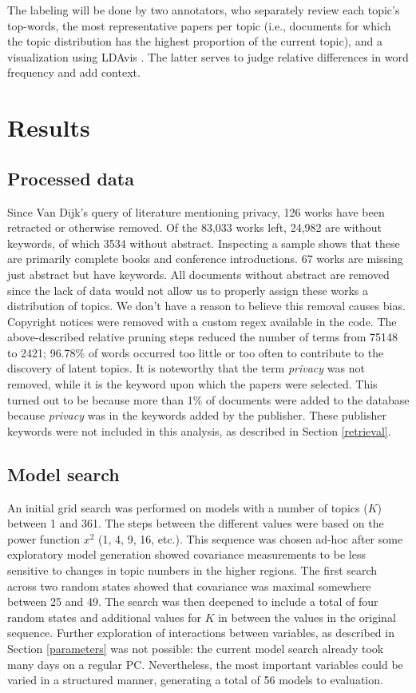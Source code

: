 \documentclass[runningheads]{llncs}
\begin{document}
The labeling will be done by two annotators, who separately review each topic’s top-words, the most representative papers per topic (i.e., documents for which the topic distribution has the highest proportion of the current topic), and a visualization using LDAvis \cite{sievert2014ldavis}. The latter serves to judge relative differences in word frequency and add context.


\section{Results}
\label{results}
\subsection{Processed data}
Since Van Dijk’s \cite{van_dijk_pillars_nodate} query of literature mentioning privacy, 126 works have been retracted or otherwise removed. Of the 83,033 works left, 24,982 are without keywords, of which 3534 without abstract. Inspecting a sample shows that these are primarily complete books and conference introductions. 67 works are missing just abstract but have keywords. All documents without abstract are removed since the lack of data would not allow us to properly assign these works a distribution of topics. We don’t have a reason to believe this removal causes bias. Copyright notices were removed with a custom regex available in the code. The above-described relative pruning steps reduced the number of terms from 75148 to 2421; 96.78\% of words occurred too little or too often to contribute to the discovery of latent topics. It is noteworthy that the term \textit{privacy} was not removed, while it is the keyword upon which the papers were selected. This turned out to be because more than 1\% of documents were added to the database because \textit{privacy} was in the keywords added by the publisher. These publisher keywords were not included in this analysis, as described in Section \ref{retrieval}.

\subsection{Model search}
\label{search}
An initial grid search was performed on models with a number of topics ($K$) between 1 and 361. The steps between the different values were based on the power function $x^2$ (1, 4, 9, 16, etc.). This sequence was chosen ad-hoc after some exploratory model generation showed covariance measurements to be less sensitive to changes in topic numbers in the higher regions. The first search across two random states showed that covariance was maximal somewhere between 25 and 49. The search was then deepened to include a total of four random states and additional values for $K$ in between the values in the original sequence. Further exploration of interactions between variables, as described in Section \ref{parameters} was not possible: the current model search already took many days on a regular PC. Nevertheless, the most important variables could be varied in a structured manner, generating a total of 56 models to evaluation.
\end{document}

